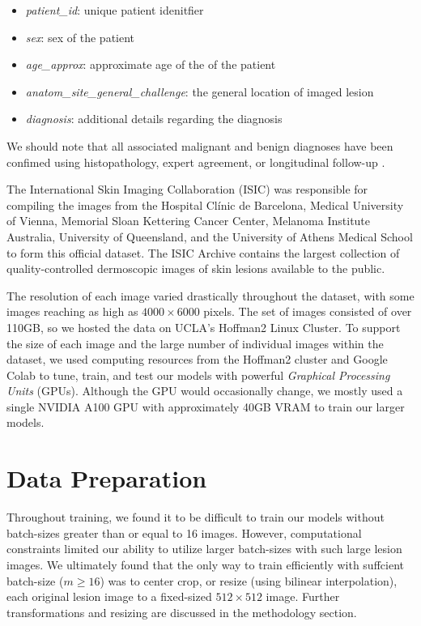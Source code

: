 \documentclass [MAS] {uclathes}
\begin{document}
\begin{itemize}
    \item \textit{patient\_id}: unique patient idenitfier
    \item \textit{sex}: sex of the patient 
    \item \textit{age\_approx}: approximate age of the of the patient
    \item \textit{anatom\_site\_general\_challenge}: the general location of imaged lesion
    \item \textit{diagnosis}: additional details regarding the diagnosis
\end{itemize}

We should note that all associated malignant and benign diagnoses have been confimed using histopathology, expert agreement, or longitudinal follow-up \cite{ISIC}.

The International Skin Imaging Collaboration (ISIC) was responsible for compiling the images from the Hospital Clínic de Barcelona, Medical University of Vienna, Memorial Sloan Kettering Cancer Center, Melanoma Institute Australia, University of Queensland, and the University of Athens Medical School to form this official dataset. The ISIC Archive contains the largest collection of quality-controlled dermoscopic images of skin lesions available to the public. 

The resolution of each image varied drastically throughout the dataset, with some images reaching as high as $4000 \times 6000$ pixels. The set of images consisted of over 110GB, so we hosted the data on UCLA's Hoffman2 Linux Cluster. To support the size of each image and the large number of individual images within the dataset, we used computing resources from the Hoffman2 cluster and Google Colab to tune, train, and test our models with powerful \textit{Graphical Processing Units} (GPUs). Although the GPU would occasionally change, we mostly used a single NVIDIA A100 GPU with approximately 40GB VRAM to train our larger models.

\section{Data Preparation}

Throughout training, we found it to be difficult to train our models without batch-sizes greater than or equal to 16 images. However, computational constraints limited our ability to utilize larger batch-sizes with such large lesion images. We ultimately found that the only way to train efficiently with suffcient batch-size ($m \geq 16$) was to center crop, or resize (using bilinear interpolation), each original lesion image to a fixed-sized $512 \times 512$ image. Further transformations and resizing are discussed in the methodology section.
\end{document}
